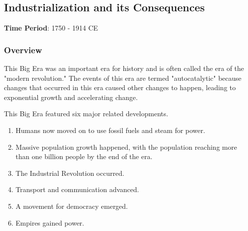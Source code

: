 \documentclass[11pt]{article}
\begin{document}
\subsection{Industrialization and its Consequences}
\label{sec:orgd82697e}

\textbf{Time Period}: 1750 - 1914 CE

\subsubsection{Overview}
\label{sec:orgb1bbd81}

This Big Era was an important era for history and is often called the era of the "modern revolution." The events of this era are termed "autocatalytic" because changes that occurred in this era caused other changes to happen, leading to exponential growth and accelerating change.

This Big Era featured six major related developments.

\begin{enumerate}
\item Humans now moved on to use fossil fuels and steam for power.
\item Massive population growth happened, with the population reaching more than one billion people by the end of the era.
\item The Industrial Revolution occurred.
\item Transport and communication advanced.
\item A movement for democracy emerged.
\item Empires gained power.
\end{enumerate}
\end{document}
